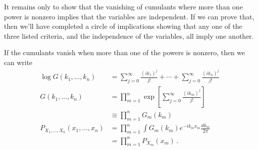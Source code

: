 It remains only to show that the vanishing of cumulants where more than one power is nonzero implies that the variables are independent.
If we can prove that, then we'll have completed a circle of implications showing that any one of the three listed criteria, and the independence of the variables, all imply one another.

If the cumulants vanish when more than one of the powers is nonzero, then we can write
\begin{align*}
\log G(k_1, \ldots , k_n)
&= \sum_{j=0}^\infty \frac{(ik_1)^j}{j!} + \cdots + \sum_{j=0}^\infty \frac{(ik_n)^j}{j!} \\
G(k_1, \ldots , k_n)
&= \prod_{m=1}^n \exp \left[ \sum_{j=0}^\infty \frac{(ik_m)^j}{j!} \right] \\
&\equiv \prod_{m=1}^n G_m(k_m) \\
P_{X_1,\ldots,X_n}(x_1,\ldots,x_n)
&= \prod_{m=1}^n \int G_m(k_m) e^{-i k_m x_m} \frac{dk_m}{2\pi} \\
&= \prod_{m=1}^n P_{X_m}(x_m) \, .
\end{align*}
